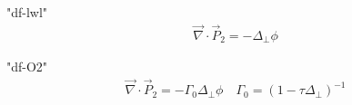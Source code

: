 "df-lwl"
\begin{subequations}
\begin{align}
  \vec{\nabla}\cdot \vec{P}_2 = -\Delta_{\perp} \phi 
\end{align}
\end{subequations}

"df-O2"
\begin{subequations}
\begin{align}
  \vec{\nabla}\cdot \vec{P}_2 = -\Gamma_0\Delta_{\perp} \phi  \quad \Gamma_0 = ( 1- \tau\Delta_{\perp})^{-1} 
\end{align}
\end{subequations}
